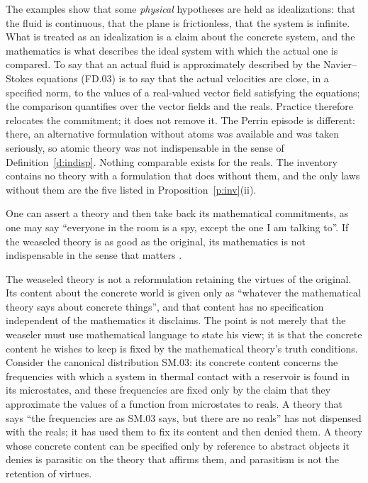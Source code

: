 \documentclass{situationist-preprint}
\begin{document}
\begin{reply}
The examples show that some \emph{physical} hypotheses are held as idealizations: that the fluid is continuous, that the plane is frictionless, that the system is infinite. What is treated as an idealization is a claim about the concrete system, and the mathematics is what describes the ideal system with which the actual one is compared. To say that an actual fluid is approximately described by the Navier--Stokes equations (FD.03) is to say that the actual velocities are close, in a specified norm, to the values of a real-valued vector field satisfying the equations; the comparison quantifies over the vector fields and the reals. Practice therefore relocates the commitment; it does not remove it. The Perrin episode is different: there, an alternative formulation without atoms was available and was taken seriously, so atomic theory was not indispensable in the sense of Definition~\ref{d:indisp}. Nothing comparable exists for the reals. The inventory contains no theory with a formulation that does without them, and the only laws without them are the five listed in Proposition~\ref{p:inv}(ii).
\end{reply}

\begin{objection}\label{o:melia}
One can assert a theory and then take back its mathematical commitments, as one may say \enquote{everyone in the room is a spy, except the one I am talking to}. If the weaseled theory is as good as the original, its mathematics is not indispensable in the sense that matters \citep{Melia2000}.
\end{objection}

\begin{reply}
The weaseled theory is not a reformulation retaining the virtues of the original. Its content about the concrete world is given only as \enquote{whatever the mathematical theory says about concrete things}, and that content has no specification independent of the mathematics it disclaims. The point is not merely that the weaseler must use mathematical language to state his view; it is that the concrete content he wishes to keep is fixed by the mathematical theory's truth conditions. Consider the canonical distribution SM.03: its concrete content concerns the frequencies with which a system in thermal contact with a reservoir is found in its microstates, and these frequencies are fixed only by the claim that they approximate the values of a function from microstates to reals. A theory that says \enquote{the frequencies are as SM.03 says, but there are no reals} has not dispensed with the reals; it has used them to fix its content and then denied them. A theory whose concrete content can be specified only by reference to abstract objects it denies is parasitic on the theory that affirms them, and parasitism is not the retention of virtues.
\end{reply}
\end{document}
